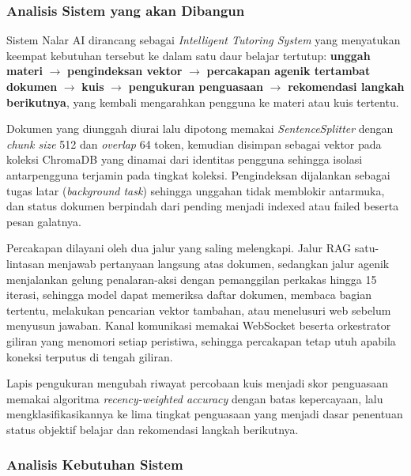 \documentclass[12pt,a4paper]{article}
\begin{document}
\subsubsection*{Analisis Sistem yang akan Dibangun}

Sistem Nalar AI dirancang sebagai \textit{Intelligent Tutoring System} yang menyatukan keempat kebutuhan tersebut ke dalam satu daur belajar tertutup: \textbf{unggah materi} \textit{$\rightarrow$} \textbf{pengindeksan vektor} \textit{$\rightarrow$} \textbf{percakapan agenik tertambat dokumen} \textit{$\rightarrow$} \textbf{kuis} \textit{$\rightarrow$} \textbf{pengukuran penguasaan} \textit{$\rightarrow$} \textbf{rekomendasi langkah berikutnya}, yang kembali mengarahkan pengguna ke materi atau kuis tertentu.



Dokumen yang diunggah diurai lalu dipotong memakai \textit{SentenceSplitter} dengan \textit{chunk size} 512 dan \textit{overlap} 64 token, kemudian disimpan sebagai vektor pada koleksi ChromaDB yang dinamai dari identitas pengguna sehingga isolasi antarpengguna terjamin pada tingkat koleksi. Pengindeksan dijalankan sebagai tugas latar (\textit{background task}) sehingga unggahan tidak memblokir antarmuka, dan status dokumen berpindah dari pending menjadi indexed atau failed beserta pesan galatnya.



Percakapan dilayani oleh dua jalur yang saling melengkapi. Jalur RAG satu-lintasan menjawab pertanyaan langsung atas dokumen, sedangkan jalur agenik menjalankan gelung penalaran-aksi dengan pemanggilan perkakas hingga 15 iterasi, sehingga model dapat memeriksa daftar dokumen, membaca bagian tertentu, melakukan pencarian vektor tambahan, atau menelusuri web sebelum menyusun jawaban. Kanal komunikasi memakai WebSocket beserta orkestrator giliran yang menomori setiap peristiwa, sehingga percakapan tetap utuh apabila koneksi terputus di tengah giliran.



Lapis pengukuran mengubah riwayat percobaan kuis menjadi skor penguasaan memakai algoritma \textit{recency-weighted accuracy} dengan batas kepercayaan, lalu mengklasifikasikannya ke lima tingkat penguasaan yang menjadi dasar penentuan status objektif belajar dan rekomendasi langkah berikutnya.



\subsubsection*{Analisis Kebutuhan Sistem}
\end{document}
